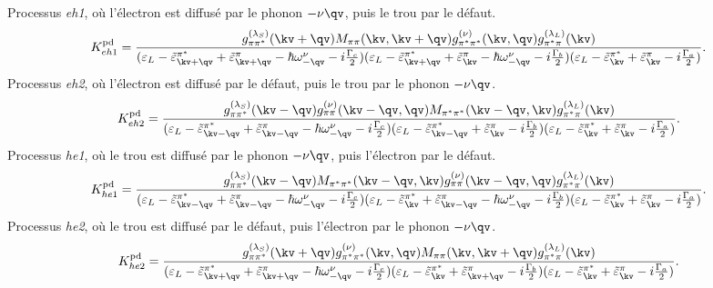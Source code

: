Processus \textit{eh1}, où l'électron est diffusé par le phonon $-\nu\qv$, puis le trou par le défaut.
\begin{equation}
        K_{eh1}^{\text{pd}} = \frac{g^{(\lambda_S)}_{\pi\pi^*}(\kv+\qv)M_{\pi\pi}(\kv, \kv+\qv)g_{\pi^*\pi^*}^{(\nu)}(\kv,\qv)g_{\pi^*\pi}^{(\lambda_L)}(\kv)}{(\varepsilon_L-\tilde{\varepsilon}_{\kv+\qv}^{\pi^*}+\tilde{\varepsilon}_{\kv+\qv}^\pi-\hbar\omega_{-\qv}^\nu-i\frac{\Gamma_c}{2})(\varepsilon_L-\tilde{\varepsilon}_{\kv+\qv}^{\pi^*}+\tilde{\varepsilon}_{\kv}^\pi-\hbar\omega_{-\qv}^\nu-i\frac{\Gamma_b}{2})(\varepsilon_L-\tilde{\varepsilon}_\kv^{\pi^*}+\tilde{\varepsilon}_{\kv}^\pi-i\frac{\Gamma_a}{2})}\label{eqn:pd_eh1}.
\end{equation}
Processus \textit{eh2}, où l'électron est diffusé par le défaut, puis le trou par le phonon $-\nu\qv$.
\begin{equation}
        K_{eh2}^{\text{pd}} = \frac{g^{(\lambda_S)}_{\pi\pi^*}(\kv-\qv)g^{(\nu)}_{\pi\pi}(\kv-\qv,\qv)M_{\pi^*\pi^*}(\kv-\qv,\kv)g_{\pi^*\pi}^{(\lambda_L)}(\kv)}{(\varepsilon_L-\tilde{\varepsilon}_{\kv-\qv}^{\pi^*}+\tilde{\varepsilon}_{\kv-\qv}^\pi-\hbar\omega_{-\qv}^\nu-i\frac{\Gamma_c}{2})(\varepsilon_L-\tilde{\varepsilon}_{\kv-\qv}^{\pi^*}+\tilde{\varepsilon}_{\kv}^\pi-i\frac{\Gamma_b}{2})(\varepsilon_L-\tilde{\varepsilon}_\kv^{\pi^*}+\tilde{\varepsilon}_{\kv}^\pi-i\frac{\Gamma_a}{2})}\label{eqn:pd_eh2}.
\end{equation}
Processus \textit{he1}, où le trou est diffusé par le phonon $-\nu\qv$, puis l'électron par le défaut.
\begin{equation}
        K_{he1}^{\text{pd}} = \frac{g^{(\lambda_S)}_{\pi\pi^*}(\kv-\qv)M_{\pi^*\pi^*}(\kv-\qv, \kv)g_{\pi\pi}^{(\nu)}(\kv-\qv,\qv)g_{\pi^*\pi}^{(\lambda_L)}(\kv)}{(\varepsilon_L-\tilde{\varepsilon}_{\kv-\qv}^{\pi^*}+\tilde{\varepsilon}_{\kv-\qv}^\pi-\hbar\omega_{-\qv}^\nu-i\frac{\Gamma_c}{2})(\varepsilon_L-\tilde{\varepsilon}_{\kv}^{\pi^*}+\tilde{\varepsilon}_{\kv-\qv}^\pi-\hbar\omega_{-\qv}^\nu-i\frac{\Gamma_b}{2})(\varepsilon_L-\tilde{\varepsilon}_\kv^{\pi^*}+\tilde{\varepsilon}_{\kv}^\pi-i\frac{\Gamma_a}{2})}\label{eqn:pd_he1}.
\end{equation}
Processus \textit{he2}, où le trou est diffusé par le défaut, puis l'électron par le phonon $-\nu\qv$.
\begin{equation}
        K_{he2}^{\text{pd}} = \frac{g^{(\lambda_S)}_{\pi\pi^*}(\kv+\qv)g^{(\nu)}_{\pi^*\pi^*}(\kv,\qv)M_{\pi\pi}(\kv,\kv+\qv)g_{\pi^*\pi}^{(\lambda_L)}(\kv)}{(\varepsilon_L-\tilde{\varepsilon}_{\kv+\qv}^{\pi^*}+\tilde{\varepsilon}_{\kv+\qv}^\pi-\hbar\omega_{-\qv}^\nu-i\frac{\Gamma_c}{2})(\varepsilon_L-\tilde{\varepsilon}_{\kv}^{\pi^*}+\tilde{\varepsilon}_{\kv+\qv}^\pi-i\frac{\Gamma_b}{2})(\varepsilon_L-\tilde{\varepsilon}_\kv^{\pi^*}+\tilde{\varepsilon}_{\kv}^\pi-i\frac{\Gamma_a}{2})}\label{eqn:pd_he2}.
\end{equation}